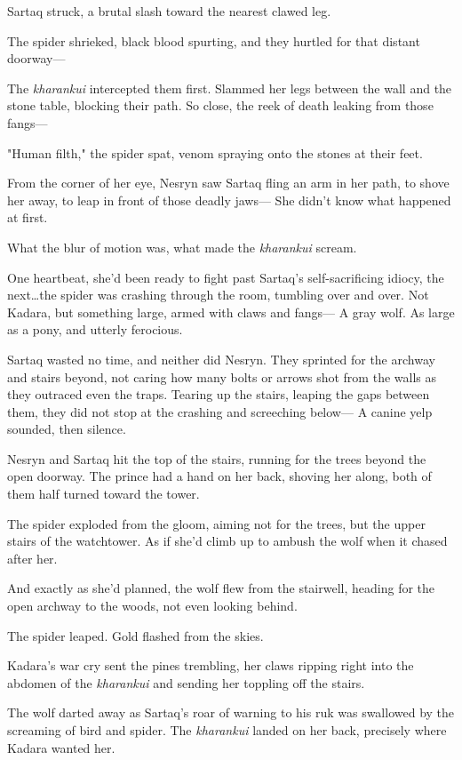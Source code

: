 Sartaq struck, a brutal slash toward the nearest clawed leg.

The spider shrieked, black blood spurting, and they hurtled for that distant doorway---

The \emph{kharankui} intercepted them first.
Slammed her legs between the wall and the stone table, blocking their path.
So close, the reek of death leaking from those fangs---

"Human filth," the spider spat, venom spraying onto the stones at their feet.

From the corner of her eye, Nesryn saw Sartaq fling an arm in her path, to shove her away, to leap in front of those deadly jaws--- She didn't know what happened at first.

What the blur of motion was, what made the \emph{kharankui} scream.

One heartbeat, she'd been ready to fight past Sartaq's self-sacrificing idiocy, the next\ldots the spider was crashing through the room, tumbling over and over.
Not Kadara, but something large, armed with claws and fangs--- A gray wolf.
As large as a pony, and utterly ferocious.

Sartaq wasted no time, and neither did Nesryn.
They sprinted for the archway and stairs beyond, not caring how many bolts or arrows shot from the walls as they outraced even the traps.
Tearing up the stairs, leaping the gaps between them, they did not stop at the crashing and screeching below--- A canine yelp sounded, then silence.

Nesryn and Sartaq hit the top of the stairs, running for the trees beyond the open doorway.
The prince had a hand on her back, shoving her along, both of them half turned toward the tower.

The spider exploded from the gloom, aiming not for the trees, but the upper stairs of the watchtower.
As if she'd climb up to ambush the wolf when it chased after her.

And exactly as she'd planned, the wolf flew from the stairwell, heading for the open archway to the woods, not even looking behind.

The spider leaped.
Gold flashed from the skies.

Kadara's war cry sent the pines trembling, her claws ripping right into the abdomen of the \emph{kharankui} and sending her toppling off the stairs.

The wolf darted away as Sartaq's roar of warning to his ruk was swallowed by the screaming of bird and spider.
The \emph{kharankui}
landed on her back, precisely where Kadara wanted her.

